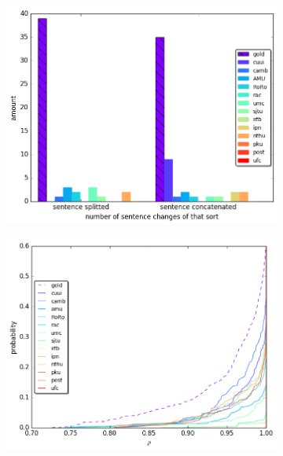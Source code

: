 \documentclass[letter,11pt]{article}
\newcommand{\com}[1]{}
\begin{document}
	
	\begin{figure}[tbp]
		\centering
		\begin{subfigure}[]{0.4\textwidth}
			\includegraphics[width = \textwidth]{aligned}
			\com{\caption{Number of source sentences (y-axis) split 
					(right bars) or concatenated (left bars) in the correction, according to the gold standard (striped column) and different correctors (colored columns). The gold standard makes about an order of magnitude more splits and concatenations than the correctors.\label{fig:split}}}
		\end{subfigure}
		
		\begin{subfigure}[]{0.4\textwidth}
			\com{\caption{\label{fig:rho}}}
			\includegraphics[width = \textwidth]{spearman_ecdf}
			\com{\caption{Empirical cumulative probability (y-axis) of a sentence to get Spearman's rho values (x-axis) of word alignment. The gold standard(dotted line) makes word change alterations to more sentences than the correctors, and within these sentences, it changes order more substantially.\label{fig:rho}}}
		\end{subfigure}
		

\end{figure}
\end{document}
